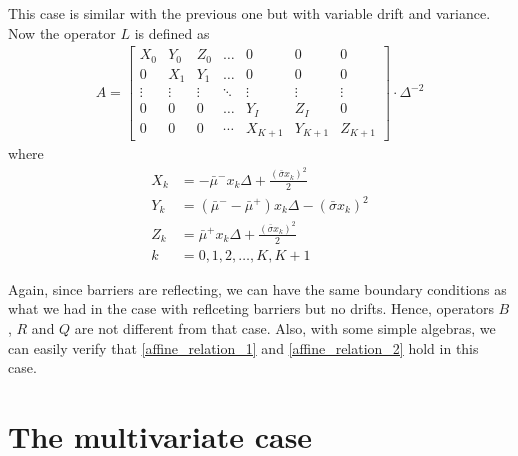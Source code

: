 \documentclass[11pt]{article}
\begin{document}
This case is similar with the previous one but with variable drift and variance. Now the operator $L$ is defined as
\begin{align}
A = \begin{bmatrix}
X_0&Y_0&Z_0&\dots&0&0&0\\
0&X_1&Y_1&\dots&0&0&0\\
\vdots&\vdots&\vdots&\ddots&\vdots&\vdots&\vdots\\
0&0&0&\dots&Y_I&Z_I&0\\
0&0&0&\cdots&X_{K+1}&Y_{K+1}&Z_{K+1}
\end{bmatrix}\cdot \Delta^{-2}\nonumber
\end{align}
where
\begin{align*}
X_k &= -\bar{\mu}^-x_k\Delta+\frac{(\bar{\sigma}x_k)^2}{2}\\
Y_k &= (\bar{\mu}^--\bar{\mu}^+)x_k\Delta-(\bar{\sigma}x_k)^2\\
Z_k &=\bar{\mu}^+x_k\Delta+\frac{(\bar{\sigma}x_k)^2}{2}\\
k & = 0, 1, 2,\dots, K, K+1
\end{align*}

Again, since barriers are reflecting, we can have the same boundary conditions as what we had in the case with reflceting barriers but no drifts. Hence, operators $B$, $R$ and $Q$ are not different from that case. Also, with some simple algebras, we can easily verify that \eqref{affine_relation_1} and \eqref{affine_relation_2} hold in this case.


\iffalse %
\section{The multivariate case}
\end{document}
